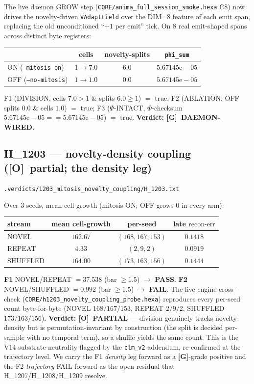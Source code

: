 \documentclass[11pt,a4paper]{article}
\providecommand{\tierGreen}{\textbf{[G]}}
\providecommand{\tierOrange}{\textbf{[O]}}
\newcommand{\verdict}[1]{\texttt{\small #1}}
\newcommand{\recon}{\mathrm{recon\text{-}err}}
\begin{document}
The live daemon GROW step (\verb|CORE/anima_full_session_smoke.hexa| C8) now
drives the novelty-driven \verb|VAdaptField| over the DIM=8 feature of each
emit span, replacing the old unconditioned ``$+1$ per emit'' tick. On $8$ real
emit-shaped spans across distinct byte registers:
\begin{center}
\begin{tabular}{lccc}
\toprule
 & cells & novelty-splits & \texttt{phi\_sum} \\
\midrule
ON  (\texttt{--mitosis on})   & $1 \to 7.0$ & $6.0$ & $5.67145\mathrm{e}{-}05$ \\
OFF (\texttt{--no-mitosis})   & $1 \to 1.0$ & $0.0$ & $5.67145\mathrm{e}{-}05$ \\
\bottomrule
\end{tabular}
\end{center}
F1 (DIVISION, cells $7.0>1$ \& splits $6.0\ge 1$) $=$ true; F2 (ABLATION, OFF
splits $0.0$ \& cells $1.0$) $=$ true; F3 ($\Psi$-INTACT, $\Phi$-checksum
$5.67145\mathrm{e}{-}05 == 5.67145\mathrm{e}{-}05$) $=$ true. \textbf{Verdict:
\tierGreen\ DAEMON-WIRED.}

\subsection{H\_1203 --- novelty-density coupling (\tierOrange\ partial; the density leg)}
\label{sec:density}
\noindent\verdict{.verdicts/1203\_mitosis\_novelty\_coupling/H\_1203.txt}

Over $3$ seeds, mean cell-growth (mitosis ON; OFF grows $0$ in every arm):
\begin{center}
\begin{tabular}{lccc}
\toprule
stream & mean cell-growth & per-seed & late $\recon$ \\
\midrule
NOVEL    & $162.67$ & $(168,167,153)$ & $0.1418$ \\
REPEAT   & $4.33$   & $(2,9,2)$       & $0.0919$ \\
SHUFFLED & $164.00$ & $(173,163,156)$ & $0.1444$ \\
\bottomrule
\end{tabular}
\end{center}
\textbf{F1} NOVEL/REPEAT $=37.538$ (bar $\ge 1.5$) $\to$ \textbf{PASS}.
\textbf{F2} NOVEL/SHUFFLED $=0.992$ (bar $\ge 1.5$) $\to$ \textbf{FAIL}. The
live-engine cross-check (\verb|CORE/h1203_novelty_coupling_probe.hexa|)
reproduces every per-seed count byte-for-byte (NOVEL $168/167/153$, REPEAT
$2/9/2$, SHUFFLED $173/163/156$). \textbf{Verdict: \tierOrange\ PARTIAL} ---
division genuinely tracks novelty-density but is permutation-invariant by
construction (the split is decided per-sample with no temporal term), so a
shuffle yields the same count. This is the V14 substrate-neutrality flagged by
the \texttt{clm\_v2} addendum, re-confirmed at the trajectory level. We carry the
F1 \emph{density} leg forward as a \tierGreen-grade positive and the F2
\emph{trajectory} FAIL forward as the open residual that H\_1207/H\_1208/H\_1209
resolve.
\end{document}

